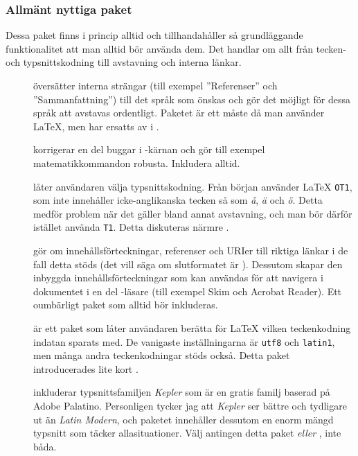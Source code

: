 \documentclass[lang=sv,ptsize=10pt,font=none,nomath,titles=bf,../../a4.tex]{subfiles}
\begin{document}
\subsubsection{Allmänt nyttiga paket}
Dessa paket finns i princip alltid och tillhandahåller så grundläggande
funktionalitet att man alltid bör använda dem. Det handlar om allt från
tecken- och typsnittskodning till avstavning och interna länkar.

\begin{description}
	\item[]
	översätter interna strängar (till exempel ”Referenser” och 
	”Sammanfattning”) till det språk som önskas och gör det möjligt för
	dessa språk att avstavas ordentligt. Paketet är ett måste då man
	använder \LaTeX, men har ersatts av  i \XeTeX.
	
	\newpage
	\item[]
	korrigerar en del buggar i \LaTeXe-kärnan och gör till 
	exempel matematikkommandon robusta. Inkludera alltid.
	
	\item[]
	låter användaren välja typsnittskodning. Från början använder \LaTeX{}
	\texttt{OT1}, som inte innehåller icke-anglikanska tecken så som
	\emph{å}, \emph{ä} och \emph{ö}. Detta medför problem när det gäller
	bland annat avstavning, och man bör därför istället använda 
	\texttt{T1}. Detta diskuteras närmre .
	
	\item[]
	gör om innehållsförteckningar, referenser och URIer till riktiga
	länkar i de fall detta stöds (det vill säga om slutformatet är \PDF).
	Dessutom skapar den inbyggda innehållsförteckningar som kan användas
	för att navigera i dokumentet i en del \PDF-läsare (till exempel Skim
	och Acrobat Reader).
	Ett oumbärligt paket som alltid bör inkluderas.
	
	\item[]
	är ett paket som låter användaren berätta för \LaTeX{} vilken
	teckenkodning indatan sparats med. De vanigaste inställningarna är
	\texttt{utf8} och \texttt{latin1}, men många andra teckenkodningar
	stöds också.
	Detta paket introducerades lite kort .

	\item[]
	inkluderar typsnittsfamiljen \emph{Kepler} som är en gratis familj
	baserad på Adobe Palatino. Personligen tycker jag att \emph{Kepler}
	ser bättre och tydligare ut än \emph{Latin Modern}, och paketet
	innehåller dessutom en enorm mängd typsnitt som täcker allasituationer.
	Välj antingen detta paket \emph{eller} , inte båda.
	

\end{description}
\end{document}
